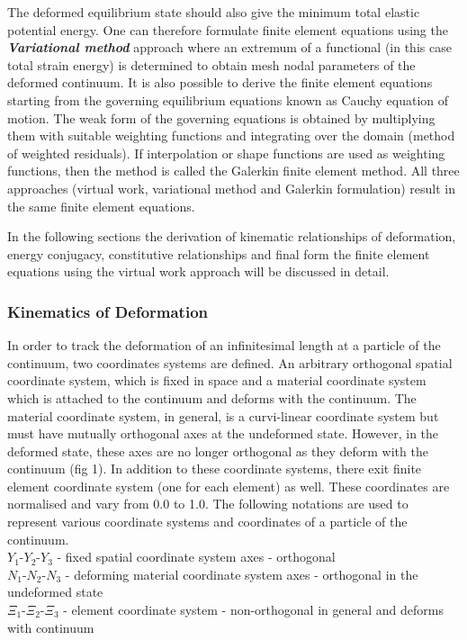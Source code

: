 The deformed equilibrium state should also give the minimum total elastic potential energy. One can therefore formulate finite element equations 
using the \textit{\textbf{Variational method}} approach where an extremum of a functional (in this case total strain energy) is determined to 
obtain mesh nodal parameters of the deformed continuum. It is also possible to derive the finite element equations starting from the governing
equilibrium equations known as Cauchy equation of motion. The weak form of the governing equations is obtained by multiplying them with suitable
weighting functions and integrating over the domain (method of weighted residuals). If interpolation or shape functions are used as weighting 
functions, then the method is called the Galerkin finite element method. All three approaches (virtual work, variational method and 
Galerkin formulation) result in the same finite element equations.     

In the following sections the derivation of kinematic relationships of deformation, energy conjugacy, constitutive relationships and final form 
the finite element equations using the virtual work approach will be discussed in detail.

\subsubsection{Kinematics of Deformation}
In order to track the deformation of an infinitesimal length at a particle of the continuum, two coordinates systems are defined. An arbitrary
orthogonal spatial coordinate system, which is fixed in space and a material coordinate system which is attached to the continuum and deforms 
with the continuum. The material coordinate system, in general, is a curvi-linear coordinate system but must have mutually orthogonal axes at the
undeformed state. However, in the deformed state, these axes are no longer orthogonal as they deform with the continuum (fig 1). In addition
to these coordinate systems, there exit finite element coordinate system (one for each element) as well. These coordinates are normalised and 
vary from 0.0 to 1.0. The following notations are used to represent various coordinate systems and coordinates of a particle of the continuum.\\

\noindent $Y_{1}$-$Y_{2}$-$Y_{3}$ - fixed spatial coordinate system axes - orthogonal\\
$N_{1}$-$N_{2}$-$N_{3}$ - deforming material coordinate system axes  - orthogonal in the undeformed state\\
$\Xi_{1}$-$\Xi_{2}$-$\Xi_{3}$ - element coordinate system - non-orthogonal in general and deforms with continuum\\

